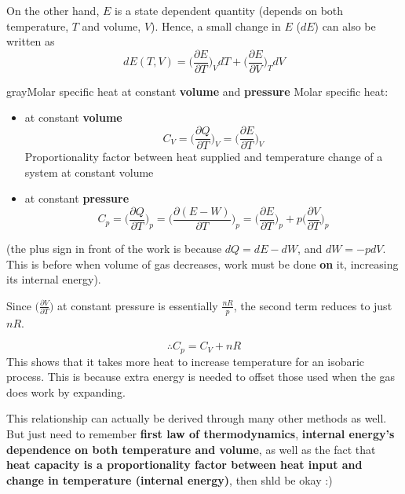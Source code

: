 On the other hand, $E$ is a state dependent quantity (depends on both temperature, $T$ and volume, $V$). Hence, a small change in $E$ ($dE$) can also be written as
\begin{equation}
    dE(T,V)=\bigg(\frac{\partial E}{\partial T}\bigg)_V dT+\bigg(\frac{\partial E}{\partial V}\bigg)_T dV
\end{equation}
\begin{mybox}{gray}{Molar specific heat at constant \textbf{volume} and \textbf{pressure}}
    Molar specific heat:
    \begin{itemize}
        \item at constant \textbf{volume}
              \begin{equation}
                  C_V=\bigg(\frac{\partial Q}{\partial T}\bigg)_V=\bigg(\frac{\partial E}{\partial T}\bigg)_V
              \end{equation}
              Proportionality factor between heat supplied and temperature change of a system at constant volume
        \item at constant \textbf{pressure}
              \begin{equation}
                  C_p
                  =\bigg(\frac{\partial Q}{\partial T}\bigg)_p
                  =\bigg(\frac{\partial (E-W)}{\partial T}\bigg)_p
                  =\bigg(\frac{\partial E}{\partial T}\bigg)_p+
                  p\bigg(\frac{\partial V}{\partial T}\bigg)_p
              \end{equation}
    \end{itemize}
    (the plus sign in front of the work is because $dQ=dE-dW$, and $dW=-pdV$. This is before when volume of gas decreases, work must be done \textbf{on} it, increasing its internal energy).
    \begin{flushleft}
        Since $\big(\frac{\partial V}{\partial T}\big)$ at constant pressure is essentially $\frac{nR}{p}$, the second term reduces to just $nR$.
    \end{flushleft}

    $$\boxed{\therefore C_p=C_V+nR}$$
    This shows that it takes more heat to increase temperature for an isobaric process. This is because extra energy is needed to offset those used when the gas does work by expanding.

    This relationship can actually be derived through many other methods as well. But just need to remember
    \textbf{first law of thermodynamics}, \textbf{internal energy's dependence on both temperature and volume}, as well as the fact that \textbf{heat capacity is a proportionality factor between heat input and change in temperature (internal energy)}, then shld be okay :)

\end{mybox}
